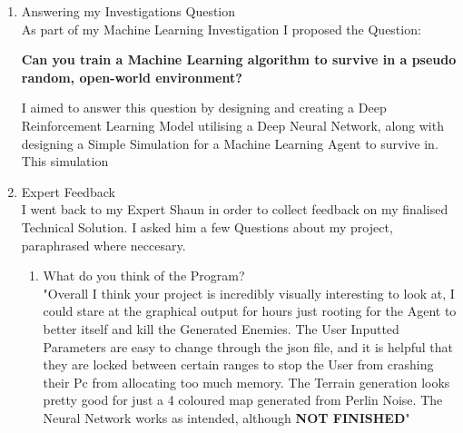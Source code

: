 \begin{flushleft}
\begin{enumerate}
\begin{enumerate}
                    \vspace{0.5cm}   
            \end{enumerate}

            \vspace{0.5cm}
        \item {\Large Answering my Investigations Question} \\
            \vspace{0.2cm}
            As part of my Machine Learning Investigation I proposed the Question:

            \vspace{0.3cm}\begin{center}
            \textbf{Can you train a Machine Learning algorithm to survive in a pseudo random, open-world environment?}
            \end{center}\vspace{0.3cm}

            I aimed to answer this question by designing and creating a Deep Reinforcement Learning Model utilising a Deep Neural Network, along 
            with designing a Simple Simulation for a Machine Learning Agent to survive in. This simulation

            \vspace{0.5cm}

        \item {\Large Expert Feedback} \\
            \vspace{0.2cm}
            I went back to my Expert Shaun in order to collect feedback on my finalised Technical Solution. I asked him a few Questions about my
            project, paraphrased where neccesary. \\
            \vspace{0.5cm}

            \begin{enumerate}
                \item What do you think of the Program? \\
                    \vspace{0.2cm}
                    "Overall I think your project is incredibly visually interesting to look at, I could stare at the graphical output for hours
                    just rooting for the Agent to better itself and kill the Generated Enemies. The User Inputted Parameters are easy to change
                    through the json file, and it is helpful that they are locked between certain ranges to stop the User from crashing their Pc
                    from allocating too much memory. The Terrain generation looks pretty good for just a 4 coloured map generated from Perlin Noise.
                    The Neural Network works as intended, although \textbf{NOT FINISHED}"


\end{enumerate}
\end{enumerate}
\end{flushleft}
